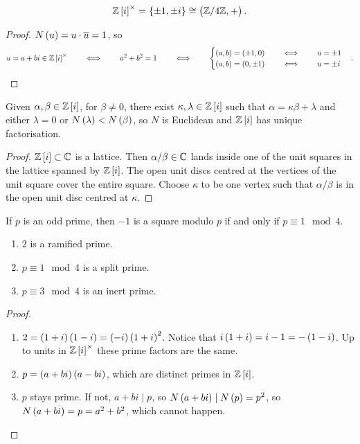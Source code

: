 \begin{theorem}
$$ \Z\sbr{i}^\times = \cbr{\pm 1, \pm i} \cong \br{\Z / 4\Z, +}. $$
\end{theorem}

\begin{proof}
$ N\br{u} = u \cdot \overline{u} = 1 $, so
$$ u = a + bi \in \Z\sbr{i}^\times \qquad \iff \qquad a^2 + b^2 = 1 \qquad \iff \qquad
\begin{cases}
\br{a, b} = \br{\pm 1, 0} \qquad \iff \qquad u = \pm 1 \\
\br{a, b} = \br{0, \pm 1} \qquad \iff \qquad u = \pm i
\end{cases}.
$$
\end{proof}

\begin{theorem}
Given $ \alpha, \beta \in \Z\sbr{i} $, for $ \beta \ne 0 $, there exist $ \kappa, \lambda \in \Z\sbr{i} $ such that $ \alpha = \kappa\beta + \lambda $ and either $ \lambda = 0 $ or $ N\br{\lambda} < N\br{\beta} $, so $ N $ is Euclidean and $ \Z\sbr{i} $ has unique factorisation.
\end{theorem}

\begin{proof}
$ \Z\sbr{i} \subset \C $ is a lattice. Then $ \alpha / \beta \in \mathbb{C} $ lands inside one of the unit squares in the lattice spanned by $ \Z\sbr{i} $. The open unit discs centred at the vertices of the unit square cover the entire square. Choose $ \kappa $ to be one vertex such that $ \alpha / \beta $ is in the open unit disc centred at $ \kappa $.
\end{proof}

\begin{lemma}
If $ p $ is an odd prime, then $ -1 $ is a square modulo $ p $ if and only if $ p \equiv 1 \mod 4 $.
\end{lemma}

\begin{theorem}
\hfill
\begin{enumerate}
\item $ 2 $ is a ramified prime.
\item $ p \equiv 1 \mod 4 $ is a split prime.
\item $ p \equiv 3 \mod 4 $ is an inert prime.
\end{enumerate}
\end{theorem}

\begin{proof}
\hfill
\begin{enumerate}
\item $ 2 = \br{1 + i}\br{1 - i} = \br{-i}\br{1 + i}^2 $. Notice that $ i\br{1 + i} = i - 1 = -\br{1 - i} $. Up to units in $ \Z\sbr{i}^\times $ these prime factors are the same.
\item $ p = \br{a + bi}\br{a - bi} $, which are distinct primes in $ \Z\sbr{i} $.
\item $ p $ stays prime. If not, $ a + bi \mid p $, so $ N\br{a + bi} \mid N\br{p} = p^2 $, so $ N\br{a + bi} = p = a^2 + b^2 $, which cannot happen.
\end{enumerate}
\end{proof}

